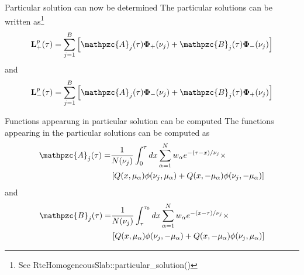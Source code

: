\documentclass[14]{beamer}
\newcommand{\mvec}[1]{\mathbf{#1}}
\newcommand{\gvec}[1]{\boldsymbol{#1}}
\newcommand{\script}[1]{\mathpzc{#1}}
\begin{document}
\begin{frame}{Particular solution can now be determined}
  The particular solutions can be written as\footnote{See
    RteHomogeneousSlab::particular\_solution()}
  \begin{align}
    \mvec{L}^p_+(\tau) = \sum_{j=1}^B
    \left[
      \script{A}_j(\tau) \gvec{\Phi}_+(\nu_j) +
      \script{B}_j(\tau) \gvec{\Phi}_-(\nu_j)
    \right]
  \end{align}
  and
  \begin{align}
    \mvec{L}^p_-(\tau) = \sum_{j=1}^B
    \left[
      \script{A}_j(\tau) \gvec{\Phi}_-(\nu_j) +
      \script{B}_j(\tau) \gvec{\Phi}_+(\nu_j)
    \right]
  \end{align}
\end{frame}

\begin{frame}{Functions appearung in particular solution can be
    computed}
  The functions appearing in the particular solutions can be computed
  as
  \begin{align}
    \script{A}_j(\tau) = &\frac{1}{N(\nu_j)}
    \int_0^\tau dx
    \sum_{\alpha=1}^N w_\alpha e^{-(\tau-x)/\nu_j} \times \notag \\
    & \left[
      Q(x,\mu_\alpha)\phi(\nu_j,\mu_\alpha) +
      Q(x,-\mu_\alpha)\phi(\nu_j,-\mu_\alpha)
      \right]
  \end{align}
  and
  \begin{align}
    \script{B}_j(\tau) = &\frac{1}{N(\nu_j)}
    \int_\tau^{\tau_0} dx
    \sum_{\alpha=1}^N w_\alpha e^{-(x-\tau)/\nu_j} \times \notag \\
    &\left[
      Q(x,\mu_\alpha)\phi(\nu_j,-\mu_\alpha) +
      Q(x,-\mu_\alpha)\phi(\nu_j,\mu_\alpha)
      \right]
  \end{align}
\end{frame}
\end{document}
